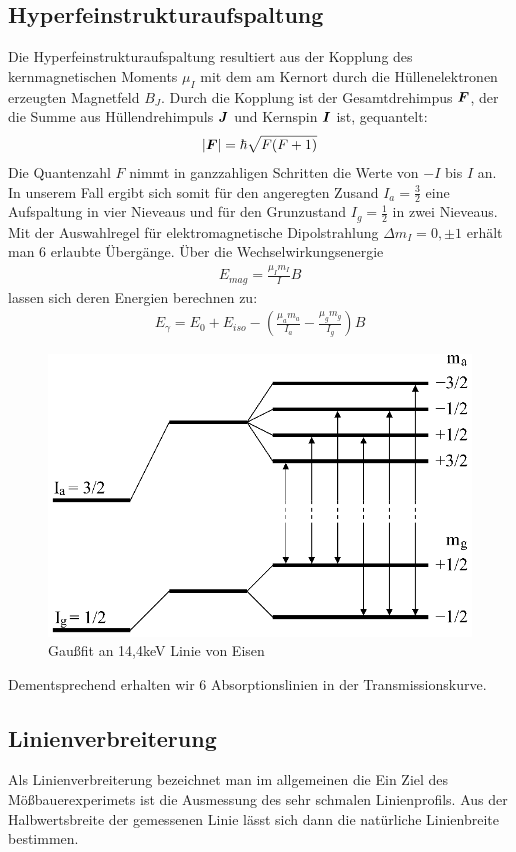 \documentclass[12pt]{article}
\renewcommand*\vec[1]{{\mbox{\boldmath\ensuremath{#1}}}}
\begin{document}
\subsection{Hyperfeinstrukturaufspaltung}
Die Hyperfeinstrukturaufspaltung resultiert aus der Kopplung des kernmagnetischen Moments $\mu_I$ mit dem am Kernort durch die Hüllenelektronen erzeugten Magnetfeld $B_J$.
Durch die Kopplung ist der Gesamtdrehimpus $\vec{F}$, der die Summe aus Hüllendrehimpuls $\vec{J}$ und Kernspin $\vec{I}$ ist, gequantelt:
\begin{align}
 \left|\vec{F}\right| = \hbar \sqrt{F(F+1)}
\end{align}
Die Quantenzahl $F$ nimmt in ganzzahligen Schritten die Werte von $-I$ bis $I$ an.
In unserem Fall ergibt sich somit für den angeregten Zusand $I_a = \frac{3}{2}$ eine Aufspaltung in vier Nieveaus und für den Grunzustand $I_g = \frac{1}{2}$ in zwei Nieveaus.
Mit der Auswahlregel für elektromagnetische Dipolstrahlung $\Delta m_I = 0, \pm 1$ erhält man $6$ erlaubte Übergänge. Über die Wechselwirkungsenergie
\begin{align}
 E_{mag} = \frac{\mu_I m_I}{I} B
\end{align}
lassen sich deren Energien berechnen zu:
\begin{align}
 E_\gamma = E_0 + E_{iso} - \left(\frac{\mu_a m_a}{I_a} - \frac{\mu_g m_g}{I_g} \right) B
\label{hfs}
\end{align}
\begin{figure}[H]
 \includegraphics[width=0.9\linewidth]{pictures/termshema_eisen.eps}
 \caption{Gaußfit an 14,4keV Linie von Eisen}
\label{eisen_term}
\end{figure}
Dementsprechend erhalten wir 6 Absorptionslinien in der Transmissionskurve.
\subsection{Linienverbreiterung}
\label{linienverbreiterung}
Als Linienverbreiterung bezeichnet man im allgemeinen die 
Ein Ziel des Mößbauerexperimets ist die Ausmessung des sehr schmalen Linienprofils. Aus der Halbwertsbreite der gemessenen Linie lässt sich dann die natürliche Linienbreite bestimmen.
\end{document}
